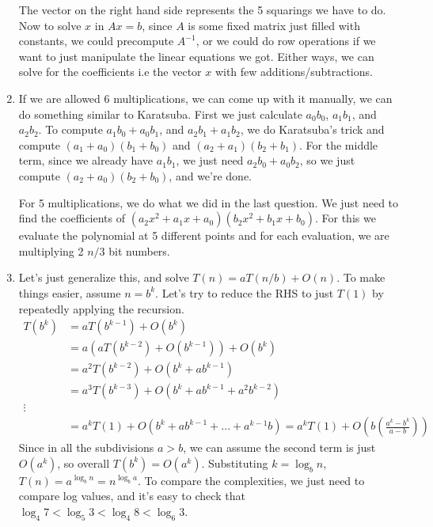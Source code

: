 \documentclass[12pt]{report}
\begin{document}
\begin{enumerate}[label=\textbf{\arabic*.}]
    The vector on the right hand side represents the 5 squarings we have to do. Now to solve $x$ in $Ax = b$, since $A$ is some fixed matrix
    just filled with constants, we could precompute $A^{-1}$, or we could do row operations if we want to just manipulate the linear equations
    we got. Either ways, we can solve for the coefficients i.e the vector $x$ with few additions/subtractions.

    \item If we are allowed 6 multiplications, we can come up with it manually, we can do something similar to Karatsuba. First we just calculate
    $a_0 b_0$, $a_1 b_1$, and $a_2 b_2$. To compute $a_1 b_0 + a_0 b_1$, and $a_2 b_1 + a_1 b_2$, we do Karatsuba's trick and compute 
    $(a_1 + a_0)(b_1 + b_0)$ and $(a_2 + a_1)(b_2 + b_1)$. For the middle term, since we already have $a_1 b_1$, we just need $a_2 b_0 + a_0 b_2$,
    so we just compute $(a_2 + a_0)(b_2 + b_0)$, and we're done.

    For 5 multiplications, we do what we did in the last question. We just need to find the coefficients of $(a_2 x^2 + a_1 x + a_0)
    (b_2 x^2 + b_1 x + b_0)$. For this we evaluate the polynomial at 5 different points and for each evaluation, we are multiplying 
    2 $n/3$ bit numbers.

    \item Let's just generalize this, and solve $T(n) = aT(n/b) + O(n)$. To make things easier, assume $n = b^k$. Let's try to reduce 
    the RHS to just $T(1)$ by repeatedly applying the recursion.
    \begin{align*}
        T(b^k) &= aT(b^{k-1}) + O(b^k) \\
        &= a(aT(b^{k-2}) + O(b^{k-1})) + O(b^k) \\
        &= a^2 T(b^{k-2}) + O(b^k + a b^{k-1}) \\
        &= a^3 T(b^{k-3}) + O(b^k + a b^{k-1} + a^2 b^{k-2}) \\
        \vdots \\
        &= a^k T(1) + O(b^k + a b^{k-1} + \dots + a^{k-1} b) = a^k T(1) + O\left(b\left(\frac{a^k - b^k}{a - b}\right)\right)
    \end{align*}
    Since in all the subdivisions $a > b$, we can assume the second term is just $O(a^k)$, so overall $T(b^k) = O(a^k)$. Substituting
    $k = \log_b n$, $T(n) = a^{\log_b n} = n^{\log_b a}$. To compare the complexities, we just need to compare log values, and it's easy
    to check that $\log_4 7 < \log_5 3 < \log_4 8 < \log_6 3$.


\end{enumerate}
\end{document}
